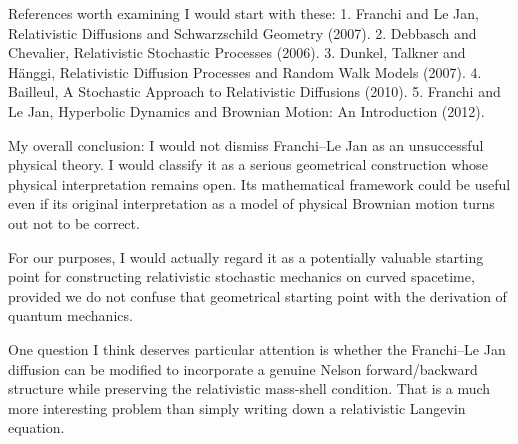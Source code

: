  References worth examining
I would start with these:
1. Franchi and Le Jan, Relativistic Diffusions and Schwarzschild Geometry (2007).
2. Debbasch and Chevalier, Relativistic Stochastic Processes (2006).
3. Dunkel, Talkner and Hänggi, Relativistic Diffusion Processes and Random Walk Models (2007).
4. Bailleul, A Stochastic Approach to Relativistic Diffusions (2010).
5. Franchi and Le Jan, Hyperbolic Dynamics and Brownian Motion: An Introduction (2012).

My overall conclusion: I would not dismiss Franchi–Le Jan as an unsuccessful physical theory. I would classify it as a serious geometrical construction whose physical interpretation remains open. Its mathematical framework could be useful even if its original interpretation as a model of physical Brownian motion turns out not to be correct.

For our purposes, I would actually regard it as a potentially valuable starting point for constructing relativistic stochastic mechanics on curved spacetime, provided we do not confuse that geometrical starting point with the derivation of quantum mechanics.

One question I think deserves particular attention is whether the Franchi–Le Jan diffusion can be modified to incorporate a genuine Nelson forward/backward structure while preserving the relativistic mass-shell condition. That is a much more interesting problem than simply writing down a relativistic Langevin equation.
